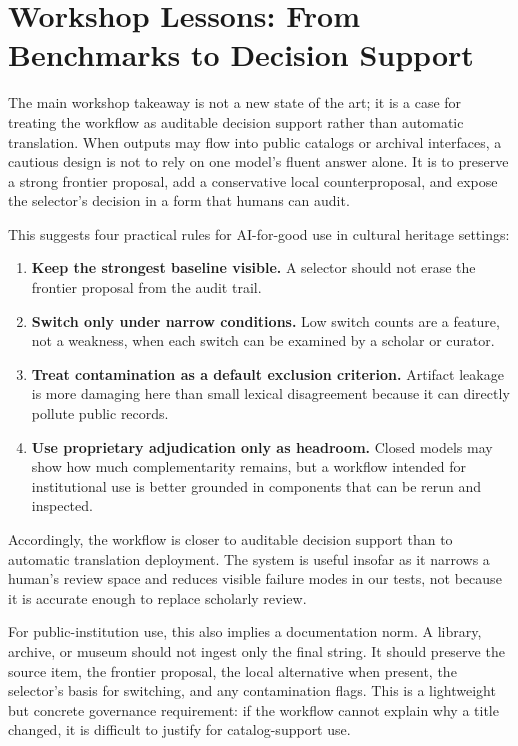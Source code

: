 \documentclass{article}
\begin{document}
\section{Workshop Lessons: From Benchmarks to Decision Support}

The main workshop takeaway is not a new state of the art; it is a case for treating the workflow as auditable decision support rather than automatic translation. When outputs may flow into public catalogs or archival interfaces, a cautious design is not to rely on one model's fluent answer alone. It is to preserve a strong frontier proposal, add a conservative local counterproposal, and expose the selector's decision in a form that humans can audit.

This suggests four practical rules for AI-for-good use in cultural heritage settings:
\begin{enumerate}
    \item \textbf{Keep the strongest baseline visible.} A selector should not erase the frontier proposal from the audit trail.
    \item \textbf{Switch only under narrow conditions.} Low switch counts are a feature, not a weakness, when each switch can be examined by a scholar or curator.
    \item \textbf{Treat contamination as a default exclusion criterion.} Artifact leakage is more damaging here than small lexical disagreement because it can directly pollute public records.
    \item \textbf{Use proprietary adjudication only as headroom.} Closed models may show how much complementarity remains, but a workflow intended for institutional use is better grounded in components that can be rerun and inspected.
\end{enumerate}

Accordingly, the workflow is closer to auditable decision support than to automatic translation deployment. The system is useful insofar as it narrows a human's review space and reduces visible failure modes in our tests, not because it is accurate enough to replace scholarly review.

For public-institution use, this also implies a documentation norm. A library, archive, or museum should not ingest only the final string. It should preserve the source item, the frontier proposal, the local alternative when present, the selector's basis for switching, and any contamination flags. This is a lightweight but concrete governance requirement: if the workflow cannot explain why a title changed, it is difficult to justify for catalog-support use.
\end{document}
